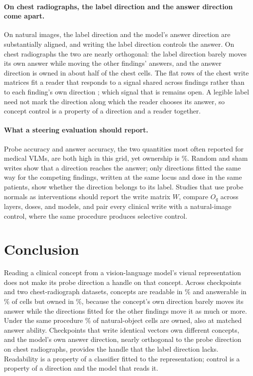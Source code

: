 \documentclass{article}
\begin{document}
\paragraph{On chest radiographs, the label direction and the answer direction come apart.}
On natural images, the label direction and the model's answer direction are substantially aligned, and writing the label direction controls the answer. On chest radiographs the two are nearly orthogonal: the label direction barely moves its own answer while moving the other findings' answers, and the answer direction is owned in about half of the chest cells. The flat rows of the chest write matrices fit a reader that responds to a signal shared across findings rather than to each finding's own direction \citep{pahde2025navigating}; which signal that is remains open. A legible label need not mark the direction along which the reader chooses its answer, so concept control is a property of a direction and a reader together.

\paragraph{What a steering evaluation should report.}
Probe accuracy and answer accuracy, the two quantities most often reported for medical VLMs, are both high in this grid, yet ownership is \cfChestOwnedPct\%. Random and sham writes show that a direction reaches the answer; only directions fitted the same way for the competing findings, written at the same locus and dose in the same patients, show whether the direction belongs to its label. Studies that use probe normals as interventions should report the write matrix $W$, compare $O_q$ across layers, doses, and models, and pair every clinical write with a natural-image control, where the same procedure produces selective control.

\section{Conclusion}
\label{sec:conclusion}

Reading a clinical concept from a vision-language model's visual representation does not make its probe direction a handle on that concept. Across \cfCheckpoints{} checkpoints and two chest-radiograph datasets, concepts are readable in \cfChestReadablePct\% and answerable in \cfChestAnswerablePct\% of cells but owned in \cfChestOwnedPct\%, because the concept's own direction barely moves its answer while the directions fitted for the other findings move it as much or more. Under the same procedure \cfCocoOwnedPct\% of natural-object cells are owned, also at matched answer ability. Checkpoints that write identical vectors own different concepts, and the model's own answer direction, nearly orthogonal to the probe direction on chest radiographs, provides the handle that the label direction lacks. Readability is a property of a classifier fitted to the representation; control is a property of a direction and the model that reads it.
\end{document}
